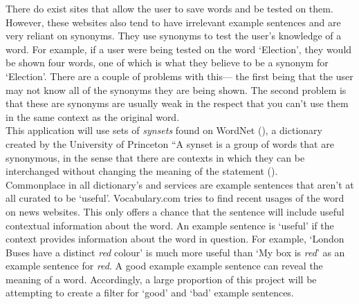 There do exist sites that allow the user to save words and be tested on them. However, these websites also tend to have irrelevant example sentences and are very reliant on synonyms. They use synonyms to test the user's knowledge of a word. For example, if a user were being tested on the word `Election', they would be shown four words, one of which is what they believe to be a synonym for `Election'. There are a couple of problems with this--- the first being that the user may not know all of the synonyms they are being shown. The second problem is that these are synonyms are usually weak in the respect that you can't use them in the same context as the original word. 
\\

This application will use sets of \emph{synsets} found on WordNet\textsuperscript{\textregistered} (\cite{miller1995wordnet}), a dictionary created by the University of Princeton ``A synset is a group of words that are synonymous, in the
sense that there are contexts in which they can be interchanged
without changing the meaning of the statement (\cite{miller1993semantic}).
\\

Commonplace in all dictionary's and services are example sentences that aren't at all curated to be `useful'. Vocabulary.com tries to find recent usages of the word on news websites. This only offers a chance that the sentence will include useful contextual information about the word. An example sentence is `useful' if the context provides information about the word in question. For example, `London Buses have a distinct \emph{red} colour' is  much more useful than `My box is \emph{red}' as an example sentence for \emph{red}. A good example example sentence can reveal the meaning of a word. Accordingly, a large proportion of this project will be attempting to create a filter for `good' and `bad' example sentences.